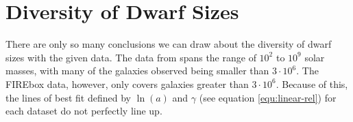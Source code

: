 \section{Diversity of Dwarf Sizes}

There are only so many conclusions we can draw about the diversity of dwarf sizes with the given data. The data from \cite{mcconnachieOBSERVEDPROPERTIESDWARF2012} spans the range of $10^2$ to $10^9$ solar masses, with many of the galaxies observed being smaller than $3 \cdot 10^6$. The FIREbox data, however, only covers galaxies greater than $3 \cdot 10^6$. Because of this, the lines of best fit defined by $\ln(a)$ and $\gamma$ (see equation \ref{equ:linear-rel}) for each dataset do not perfectly line up. 